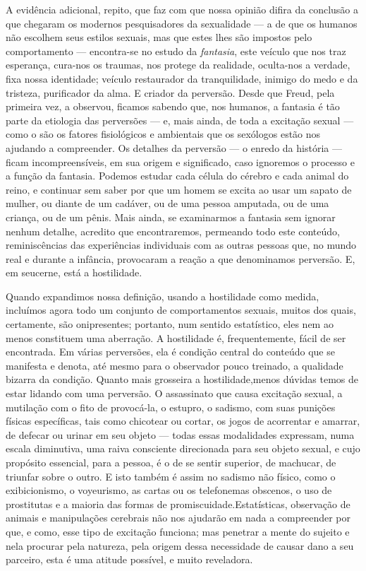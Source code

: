 A evidência adicional, repito, que faz com que nossa opinião difira
da conclusão a que chegaram os modernos pesquisadores da sexualidade ---
 a de que os humanos não escolhem seus estilos sexuais, mas que estes
lhes são impostos pelo comportamento --- encontra-se no estudo da
\textit{fantasia}, este veículo que nos traz esperança, cura-nos os
traumas, nos protege da realidade, oculta-nos a verdade, fixa nossa
identidade; veículo restaurador da tranquilidade, inimigo do medo e da
tristeza, purificador da alma. E criador da perversão. Desde que Freud,
pela primeira vez, a observou, ficamos sabendo que, nos humanos, a
fantasia é tão parte da etiologia das perversões\idxfetic{} --- e, mais ainda, de
toda a excitação sexual --- como o são os fatores fisiológicos e
ambientais que os sexólogos estão nos ajudando a compreender. Os
detalhes da perversão --- o enredo da história --- ficam incompreensíveis,
em sua origem e significado, caso ignoremos o processo e a função da
fantasia. Podemos estudar cada célula do cérebro e cada animal do
reino, e continuar sem saber por que um homem se excita ao usar um
sapato de mulher, ou diante de um cadáver,\idxnecro{} ou de uma pessoa amputada,
ou de uma criança,\idxpedof{} ou de um pênis. Mais ainda,\idxfantareal{} se examinarmos a
fantasia sem ignorar nenhum detalhe, acredito que encontraremos,
permeando todo este conteúdo, reminiscências das experiências
individuais com as outras pessoas que, no mundo real e durante a
infância, provocaram a reação a que denominamos perversão. E, em seu\idxsexop[|)]
cerne, está a hostilidade.\idxsadihost[|(]

Quando expandimos nossa definição, usando a hostilidade como medida,
incluímos agora todo um conjunto de comportamentos sexuais, muitos dos
quais, certamente, são onipresentes; portanto, num sentido estatístico,
eles nem ao menos constituem uma aberração. A hostilidade é,
frequentemente, fácil de ser encontrada. Em várias perversões, ela é
condição central do conteúdo que se manifesta e denota, até mesmo para
o observador pouco treinado, a qualidade bizarra da condição. Quanto
mais grosseira a hostilidade,\idxhostsadi[|(] menos dúvidas temos de estar lidando com
uma perversão. O assassinato\idxassas{} que causa excitação sexual, a mutilação
com o fito de provocá-la, o estupro,\idxestup{} o sadismo, com suas punições\idxsadipuni{}
físicas específicas, tais como chicotear ou cortar, os jogos de
acorrentar e amarrar,\idxamarr{} de defecar\idxcopro{} ou urinar em seu objeto --- todas essas
modalidades expressam, numa escala diminutiva, uma raiva consciente
direcionada para seu objeto sexual, e cujo propósito essencial, para a
pessoa, é o de se sentir superior, de machucar, de triunfar sobre o
outro. E isto também é assim no sadismo não físico, como o
exibicionismo,\idxexibi{} o voyeurismo,\idxvoy{} as cartas ou os telefonemas\idxtelef{} obscenos, o
uso de prostitutas e a maioria das formas de promiscuidade.\idxpromismora[|(]
Estatísticas, observação de animais e manipulações cerebrais não nos ajudarão
em nada a compreender por que, e como, esse tipo de
excitação funciona; mas penetrar a mente do sujeito e nela procurar
pela natureza, pela origem dessa necessidade de causar dano a seu
parceiro, esta é uma atitude possível, e muito reveladora.

